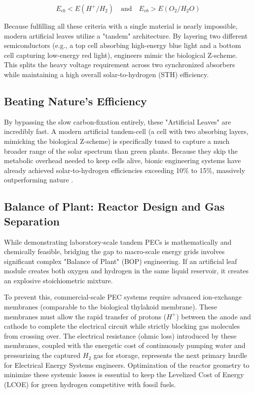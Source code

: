 \documentclass[conference]{IEEEtran}
\begin{document}
\begin{equation}
E_{cb} < E(H^+/H_2) \quad \text{and} \quad E_{vb} > E(O_2/H_2O)
\label{eq:bandgap}
\end{equation}

Because fulfilling all these criteria with a single material is nearly impossible, modern artificial leaves utilize a "tandem" architecture. By layering two different semiconductors (e.g., a top cell absorbing high-energy blue light and a bottom cell capturing low-energy red light), engineers mimic the biological Z-scheme. This splits the heavy voltage requirement across two synchronized absorbers while maintaining a high overall solar-to-hydrogen (STH) efficiency.

\subsection{Beating Nature's Efficiency}
By bypassing the slow carbon-fixation entirely, these "Artificial Leaves" are incredibly fast. A modern artificial tandem-cell (a cell with two absorbing layers, mimicking the biological Z-scheme) is specifically tuned to capture a much broader range of the solar spectrum than green plants. Because they skip the metabolic overhead needed to keep cells alive, bionic engineering systems have already achieved solar-to-hydrogen efficiencies exceeding 10\% to 15\%, massively outperforming nature \cite{gratzelPhotoelectrochemicalCells2001}.

\subsection{Balance of Plant: Reactor Design and Gas Separation}
While demonstrating laboratory-scale tandem PECs is mathematically and chemically feasible, bridging the gap to macro-scale energy grids involves significant complex "Balance of Plant" (BOP) engineering. If an artificial leaf module creates both oxygen and hydrogen in the same liquid reservoir, it creates an explosive stoichiometric mixture. 

To prevent this, commercial-scale PEC systems require advanced ion-exchange membranes (comparable to the biological thylakoid membrane). These membranes must allow the rapid transfer of protons ($H^+$) between the anode and cathode to complete the electrical circuit while strictly blocking gas molecules from crossing over. The electrical resistance (ohmic loss) introduced by these membranes, coupled with the energetic cost of continuously pumping water and pressurizing the captured $H_2$ gas for storage, represents the next primary hurdle for Electrical Energy Systems engineers. Optimization of the reactor geometry to minimize these systemic losses is essential to keep the Levelized Cost of Energy (LCOE) for green hydrogen competitive with fossil fuels.
\end{document}

